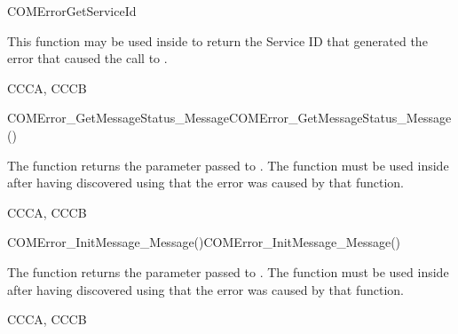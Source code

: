 
\begin{function_nopb2}{COMErrorGetServiceId}
  \begin{fundescription}
    This function may be used inside  to return the
    Service ID that generated the error that caused the call to
    . 
  \end{fundescription}
  \begin{funreturn}
  \end{funreturn}
  \begin{funconformance}
    CCCA, CCCB
  \end{funconformance}
\end{function_nopb2}


\begin{function_nopb2}{COMError\_GetMessageStatus\_Message}{COMError_GetMessageStatus_Message()}
  \begin{fundescription}
    The function returns the  parameter passed to
    . The function must be used inside  
     after having discovered using  that the error 
     was caused by that function.
  \end{fundescription}
  \begin{funreturn}
  \end{funreturn}
  \begin{funconformance}
   CCCA, CCCB
  \end{funconformance}
\end{function_nopb2}

\begin{function_nopb2}{COMError\_InitMessage\_Message()}{COMError_InitMessage_Message()}
  \begin{fundescription}
    The function returns the  parameter passed to
    . The function must be used inside  
     after having discovered using  that the error 
     was caused by that function.
  \end{fundescription}
  \begin{funreturn}
  \end{funreturn}
  \begin{funconformance}
   CCCA, CCCB
  \end{funconformance}
\end{function_nopb2}

